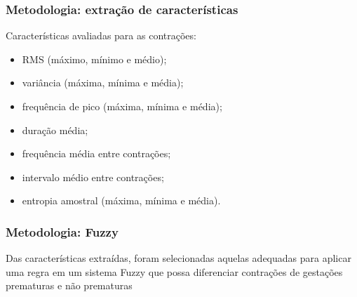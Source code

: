 \documentclass{beamer}
\begin{document}


\begin{frame}
	\frametitle{Metodologia: extração de características}	
	
	Características avaliadas para as contrações: 
	
	\begin{itemize}
		
		\item RMS (máximo, mínimo e médio);
		
		\item variância (máxima, mínima e média);
		
		\item frequência de pico (máxima, mínima e média);
		
		\item duração média;
		
		\item frequência média entre contrações;
		
		\item intervalo médio entre contrações;
		
		\item entropia amostral (máxima, mínima e média).
		
		
		
	\end{itemize}
	
\end{frame}


\begin{frame}
	\frametitle{Metodologia: Fuzzy}	
	
	Das características extraídas, foram selecionadas aquelas adequadas para aplicar uma regra em um sistema Fuzzy que possa diferenciar contrações de gestações prematuras e não prematuras	
	
\end{frame}



\end{document}
